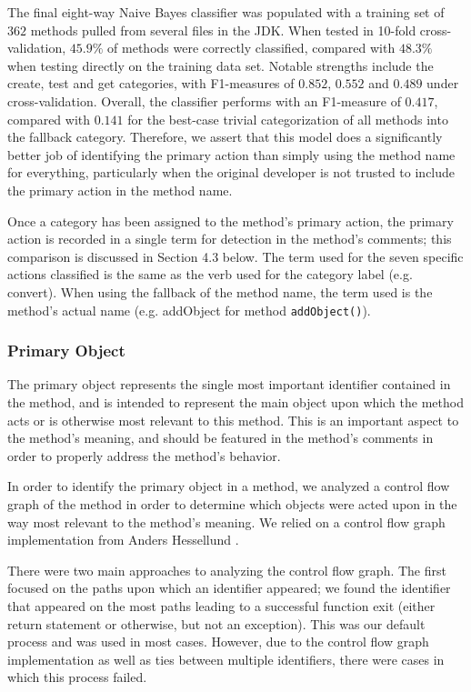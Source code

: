 \documentclass[preprint]{sigplanconf}
\begin{document}
The final eight-way Naive Bayes classifier was populated with a training set of \(362\) methods pulled from several files in the JDK. When tested in 10-fold cross-validation, \(45.9\%\) of methods were correctly classified, compared with \(48.3\%\) when testing directly on the training data set. Notable strengths include the create, test and get categories, with F1-measures of \(0.852\), \(0.552\) and \(0.489\) under cross-validation. Overall, the classifier performs with an F1-measure of \(0.417\), compared with \(0.141\) for the best-case trivial categorization of all methods into the fallback category. Therefore, we assert that this model does a significantly better job of identifying the primary action than simply using the method name for everything, particularly when the original developer is not trusted to include the primary action in the method name.

Once a category has been assigned to the method's primary action, the primary action is recorded in a single term for detection in the method's comments; this comparison is discussed in Section 4.3 below. The term used for the seven specific actions classified is the same as the verb used for the category label (e.g. convert). When using the fallback of the method name, the term used is the method's actual name (e.g. addObject for method \verb|addObject()|).

\subsubsection{Primary Object}
The primary object represents the single most important identifier contained in the method, and is intended to represent the main object upon which the method acts or is otherwise most relevant to this method. This is an important aspect to the method's meaning, and should be featured in the method's comments in order to properly address the method's behavior.

In order to identify the primary object in a method, we analyzed a control flow graph of the method in order to determine which objects were acted upon in the way most relevant to the method's meaning. We relied on a control flow graph implementation from Anders Hessellund \cite{hessellund}.

There were two main approaches to analyzing the control flow graph. The first focused on the paths upon which an identifier appeared; we found the identifier that appeared on the most paths leading to a successful function exit (either return statement or otherwise, but not an exception). This was our default process and was used in most cases. However, due to the control flow graph implementation as well as ties between multiple identifiers, there were cases in which this process failed.
\end{document}
